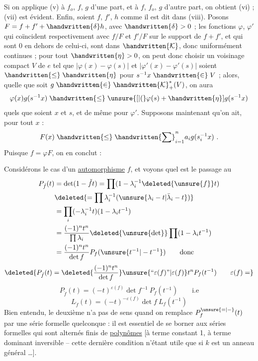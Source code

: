 Si on applique (v) à $f_o$, $f$, $g$ d'une part, et à $f$, $f_o$, $g$ d'autre part, on obtient (vi) ; (vii) est évident. Enfin, soient $f$, $f'$, $h$ comme il est dit dans (viii). Posons $F=f+f'+\handwritten{\delta} h$, avec $\handwritten{\delta}>0$ ; les fonctions $\varphi$, $\varphi'$ qui coïncident respectivement avec $f/F$ et $f'/F$ sur le support de $f+f'$, et qui sont $0$ en dehors de celui-ci, sont dans $\handwritten{\mathcal{K}}$, donc uniformément continues ; pour tout $\handwritten{\eta}>0$, on peut donc choisir un voisinage compact $V$ de $e$ tel que $|\varphi(x)-\varphi(s)|$ et $|\varphi'(x)-\varphi'(s)|$ soient $\mathrel{\handwritten{\leq}}\handwritten{\eta}$ pour $s^{-1}x\mathrel{\handwritten{\in}}V$ ; alors, quelle que soit $g\mathrel{\handwritten{\in}}\handwritten{\mathcal{K}}^{\ast}_{+}(V)$, on aura
\[
\varphi(x)g(s^{-1}x)\mathrel{\handwritten{\leq}}\unsure{[|(}\varphi(s)+\handwritten{\eta}]g(s^{-1}x)
\]
quels que soient $x$ et $s$, et de même pour $\varphi'$. Supposons maintenant qu'on ait, pour tout $x$ :
\[
F(x)\mathrel{\handwritten{\leq}}\handwritten{\sum}_{i=1}^{n}a_i g(s_i^{-1}x)\ .
\]
Puisque $f=\varphi F$, on en conclut :

Considérons le cas d'un \uline{automorphisme} $f$, et voyons quel est le passage au 
\[
\begin{aligned}
P_{\check f}(t)&=\det(1-\check f t)=\prod(1-\lambda_i^{-1}\deleted{\unsure{f}}t)\\
&\deleted{=\prod\lambda_i^{-1}(\unsure{\lambda_i-t|\bar\lambda_i-t})}\\
&=\prod_i(-\lambda_i^{-1}t)(1-\lambda_i t^{-1})\\
&=\frac{(-1)^nt^n}{\prod\lambda_i}\deleted{\unsure{\det}}\prod(1-\lambda_i t^{-1})\\
&=\frac{(-1)^nt^n}{\det f}P_f(\unsure{t^{-1}|-t^{-1}})\qquad\text{donc}
\end{aligned}
\]
\[
\deleted{P_{\check f}(t)=\deleted{\frac{(-1)^nt^n}{\det f}}\unsure{\text{``}\varepsilon(f)\text{''}|{\varepsilon(f)}}t^n P_f(t^{-1})\qquad\varepsilon(f)=}
\]
\[
\boxed{P_{\check f}(t)=(-t)^{\varepsilon(f)}\det f^{-1}\ P_f(t^{-1})}\qquad\text{i.e}
\]
\[
\boxed{L_{\check f}(t)=(-t)^{-\varepsilon(f)}\det f\ L_f(t^{-1})}
\]
Bien entendu, le deuxième  n'a pas de sens quand on remplace $P_f^{\unsure{=|-}}(t)$ par une série formelle quelconque : il est essentiel de se borner aux séries formelles qui sont  alternés finis de \uline{polynômes} [à terme constant 1, à terme dominant inversible -- cette dernière condition n'étant utile que si $k$ est un anneau général \ldots].

